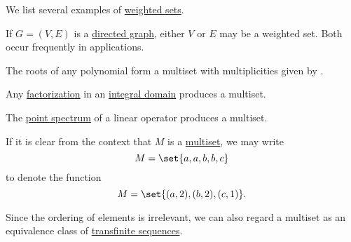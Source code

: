 \begin{example}\label{ex:def:weighted_set}
  We list several examples of \hyperref[def:weighted_set]{weighted sets}.

  \begin{itemize}
     If \( G = (V, E) \) is a \hyperref[def:quiver/simple]{directed graph}, either \( V \) or \( E \) may be a weighted set. Both occur frequently in applications.

     The roots of any polynomial form a multiset with multiplicities given by .

     Any \hyperref[def:irreducible_factorization]{factorization} in an \hyperref[def:integral_domain]{integral domain} produces a multiset.

     The \hyperref[def:eigenpair]{point spectrum} of a linear operator produces a multiset.
  \end{itemize}
\end{example}

\begin{remark}\label{rem:multiset_notation}
  If it is clear from the context that \( M \) is a \hyperref[def:weighted_set/multiset]{multiset}, we may write
  \begin{equation*}
    M = \set{ a, a, b, b, c }
  \end{equation*}
  to denote the function
  \begin{equation*}
    M = \set{ (a, 2), (b, 2), (c, 1) }.
  \end{equation*}

  Since the ordering of elements is irrelevant, we can also regard a multiset as an equivalence class of \hyperref[def:transfinite_sequence]{transfinite sequences}.
\end{remark}
